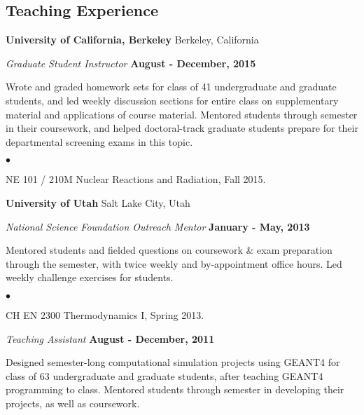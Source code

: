\documentclass[margin,line]{res}
\newenvironment{list1}{
  \begin{list}{\ding{113}}{%
      \setlength{\itemsep}{0in}
      \setlength{\parsep}{0in} \setlength{\parskip}{0in}
      \setlength{\topsep}{0in} \setlength{\partopsep}{0in} 
      \setlength{\leftmargin}{0.17in}}}{\end{list}}
\newenvironment{list2}{
  \begin{list}{$\bullet$}{%
      \setlength{\itemsep}{0in}
      \setlength{\parsep}{0in} \setlength{\parskip}{0in}
      \setlength{\topsep}{0in} \setlength{\partopsep}{0in} 
      \setlength{\leftmargin}{0.2in}}}{\end{list}}
\begin{document}
\begin{resume}
\section{\sc Teaching Experience}

{\bf University of California, Berkeley} \hfill{ Berkeley, California}

\vspace*{-.05in}
{\em Graduate Student Instructor} \hfill {\bf August - December, 2015}

\begin{list1}
\item[] Wrote and graded homework sets  for class of 41
undergraduate and graduate students, and led weekly discussion sections for entire class on supplementary material and applications of course material.
Mentored students through semester in their coursework, and helped doctoral-track graduate students prepare for their departmental screening exams in this topic.

\vspace*{.05in}  
\begin{list2}
\item NE 101 / 210M  Nuclear Reactions and Radiation, Fall 2015.
\end{list2}
\end{list1}

{\bf University of Utah} \hfill{ Salt Lake City, Utah}

\vspace*{-.05in}
{\em National Science Foundation Outreach Mentor} \hfill {\bf January - May, 2013}

\begin{list1}
\item[] Mentored students and fielded questions on coursework \& exam preparation through the semester,
with twice weekly and by-appointment office hours. Led weekly challenge exercises for students.

\vspace*{.05in}  
\begin{list2}
\item CH EN 2300  Thermodynamics I, Spring 2013.
\end{list2}
\end{list1}





{\em Teaching Assistant} \hfill {\bf August - December, 2011}

\begin{list1}
\item[] Designed semester-long computational simulation projects using GEANT4 for class of 63
undergraduate and graduate students, after teaching GEANT4 programming to class.
Mentored students through semester in developing their projects, as well as coursework.


\end{list1}
\end{resume}
\end{document}
